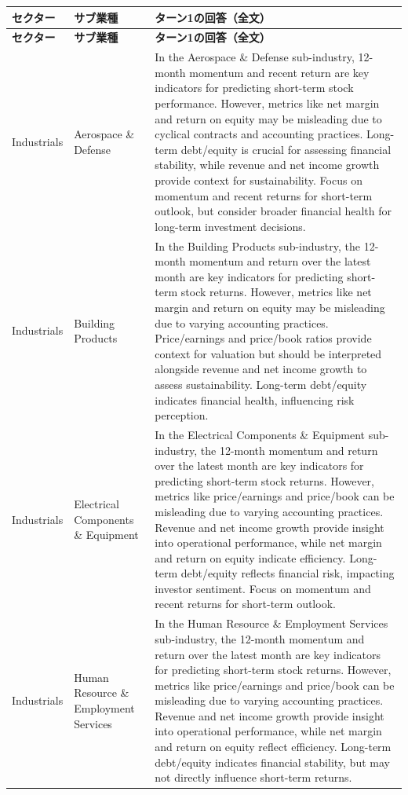 \documentclass[xelatex,ja=standard,jafont=hiragino-pron,a4paper,10pt]{bxjsreport}
\begin{document}
{\scriptsize
\begin{longtable}{p{1.90cm}p{2.90cm}p{9.60cm}}
\toprule
\textbf{セクター} & \textbf{サブ業種} & \textbf{ターン1の回答（全文）} \\
\midrule
\endfirsthead
\toprule
\textbf{セクター} & \textbf{サブ業種} & \textbf{ターン1の回答（全文）} \\
\midrule
\endhead
\bottomrule
\endfoot
Industrials & Aerospace \& Defense & In the Aerospace \& Defense sub-industry, 12-month momentum and recent return are key indicators for predicting short-term stock performance. However, metrics like net margin and return on equity may be misleading due to cyclical contracts and accounting practices. Long-term debt/equity is crucial for assessing financial stability, while revenue and net income growth provide context for sustainability. Focus on momentum and recent returns for short-term outlook, but consider broader financial health for long-term investment decisions. \\
Industrials & Building Products & In the Building Products sub-industry, the 12-month momentum and return over the latest month are key indicators for predicting short-term stock returns. However, metrics like net margin and return on equity may be misleading due to varying accounting practices. Price/earnings and price/book ratios provide context for valuation but should be interpreted alongside revenue and net income growth to assess sustainability. Long-term debt/equity indicates financial health, influencing risk perception. \\
Industrials & Electrical Components \& Equipment & In the Electrical Components \& Equipment sub-industry, the 12-month momentum and return over the latest month are key indicators for predicting short-term stock returns. However, metrics like price/earnings and price/book can be misleading due to varying accounting practices. Revenue and net income growth provide insight into operational performance, while net margin and return on equity indicate efficiency. Long-term debt/equity reflects financial risk, impacting investor sentiment. Focus on momentum and recent returns for short-term outlook. \\
Industrials & Human Resource \& Employment Services & In the Human Resource \& Employment Services sub-industry, the 12-month momentum and return over the latest month are key indicators for predicting short-term stock returns. However, metrics like price/earnings and price/book can be misleading due to varying accounting practices. Revenue and net income growth provide insight into operational performance, while net margin and return on equity reflect efficiency. Long-term debt/equity indicates financial stability, but may not directly influence short-term returns. \\

\end{longtable}}
\end{document}
